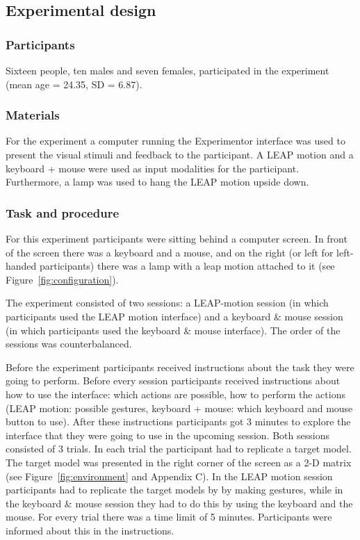 \subsection{Experimental design}
\subsubsection{Participants}
Sixteen people, ten males and seven females, participated in the experiment (mean age = 24.35, SD = 6.87). 
\subsubsection{Materials}
For the experiment a computer running the Experimentor interface was used to present the visual stimuli and feedback to the participant. A LEAP motion and a keyboard + mouse were used as input modalities for the participant. Furthermore, a lamp was used to hang the LEAP motion upside down.
\subsubsection{Task and procedure}
For this experiment participants were sitting behind a computer screen. In front of the screen there was a keyboard and a mouse, and on the right (or left for left-handed participants) there was a lamp with a leap motion attached to it (see Figure~\ref{fig:configuration}).

The experiment consisted of two sessions: a LEAP-motion session (in which participants used the LEAP motion interface) and a keyboard \& mouse session (in which participants used the keyboard \& mouse interface). The order of the sessions was counterbalanced.

Before the experiment participants received instructions about the task they were going to perform. Before every session participants received instructions about how to use the interface: which actions are possible, how to perform the actions (LEAP motion: possible gestures, keyboard + mouse: which keyboard and mouse button to use). After these instructions participants got 3 minutes to explore the interface that they were going to use in the upcoming session. 
Both sessions consisted of 3 trials. In each trial the participant had to replicate a target model. The target model was presented in the right corner of the screen as a 2-D matrix (see Figure~\ref{fig:environment} and Appendix C). In the LEAP motion session participants had to replicate the target models by by making gestures, while in the keyboard \& mouse session they had to do this by using the keyboard and the mouse. For every trial there was a time limit of 5 minutes. Participants were informed about this in the instructions.

